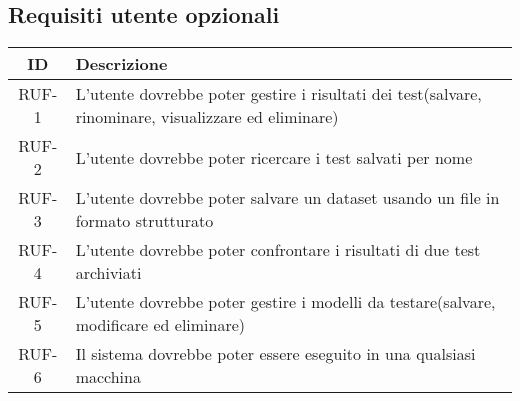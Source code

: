 \subsection{Requisiti utente opzionali}
\begin{tabularx}{\textwidth}{|c|X|}
    \hline
    \textbf{ID} & \textbf{Descrizione} \\ 
    \hline
    \label{ru:RUF-1} RUF-1 &  L'utente dovrebbe poter gestire i risultati dei test(salvare, rinominare, visualizzare ed eliminare)\\ 
    \hline
    \label{ru:RUF-2} RUF-2 & L'utente dovrebbe poter ricercare i test salvati per nome \\ 
    \hline
    \label{ru:RUF-3} RUF-3 & L'utente dovrebbe poter salvare un dataset usando un file in formato strutturato \\ 
    \hline
    \label{ru:RUF-4} RUF-4 & L'utente dovrebbe poter confrontare i risultati di due test archiviati \\ 
    \hline
    \label{ru:RUF-5} RUF-5 & L'utente dovrebbe poter gestire i modelli da testare(salvare, modificare ed eliminare)\\ \hline
    \label{ru:RUF-6} RUF-6 & Il sistema dovrebbe poter essere eseguito in una qualsiasi macchina\\ 
    \hline
\end{tabularx}
   